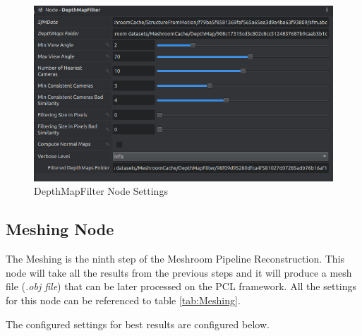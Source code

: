 \documentclass[12pt]{report}
\begin{document}
\begin{figure}[H]%
  \centering
 \includegraphics[width=1\textwidth]{DepthMapFilter.png}
\caption{DepthMapFilter Node Settings}
\label{fig:DepthMapFilter} 
\end{figure}






\subsection*{Meshing Node}
The Meshing is the ninth step of the Meshroom Pipeline Reconstruction. This node will take all the results from the previous steps
and it will produce a mesh file (\textit{.obj file}) that can be later processed on the PCL framework. 
All the settings for this node can be referenced to table \ref{tab:Meshing}.

The configured settings for best results are configured below.
\end{document}
